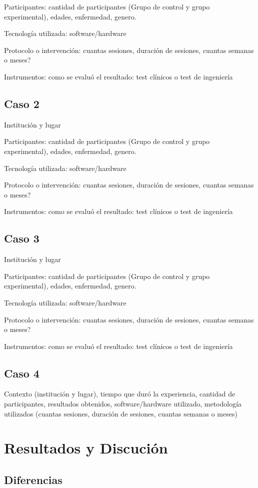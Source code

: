 \documentclass[journal]{IEEEtran}
\begin{document}
Participantes: cantidad de participantes (Grupo de control y grupo experimental), edades, enfermedad, genero.

Tecnología utilizada: software/hardware 

Protocolo o intervención: cuantas sesiones, duración de sesiones, cuantas semanas o meses?

Instrumentos: como se evaluó el resultado: test clínicos o test de ingeniería 

\subsection{Caso 2}
Institución y lugar

Participantes: cantidad de participantes (Grupo de control y grupo experimental), edades, enfermedad, genero.

Tecnología utilizada: software/hardware 

Protocolo o intervención: cuantas sesiones, duración de sesiones, cuantas semanas o meses?

Instrumentos: como se evaluó el resultado: test clínicos o test de ingeniería 


\subsection{Caso 3}
Institución y lugar

Participantes: cantidad de participantes (Grupo de control y grupo experimental), edades, enfermedad, genero.

Tecnología utilizada: software/hardware 

Protocolo o intervención: cuantas sesiones, duración de sesiones, cuantas semanas o meses?

Instrumentos: como se evaluó el resultado: test clínicos o test de ingeniería 


\subsection{Caso 4}
Contexto (institución y lugar), tiempo que duró la experiencia, cantidad de participantes, resultados obtenidos, software/hardware utilizado, metodología utilizados (cuantas sesiones, duración de sesiones, cuantas semanas o meses) 

\section{Resultados y Discución}
\subsection{Diferencias}
\end{document}
